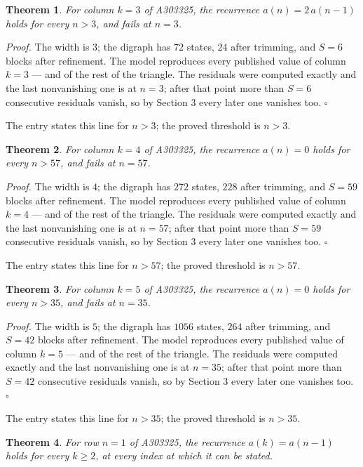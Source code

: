 \documentclass[11pt]{article}
\newtheorem{theorem}{Theorem}
\theoremstyle{definition}
\begin{document}
\begin{theorem} For column $k = 3$ of A303325, the recurrence $a(n) = 2\,a(n-1)$ holds for every $n > 3$, and fails at $n = 3$.\end{theorem}

{\itshape Proof.} The width is $3$; the digraph has $72$ states, $24$ after trimming, and $S = 6$ blocks after refinement. The model reproduces every published value of column $k = 3$ --- and of the rest of the triangle. The residuals were computed exactly and the last nonvanishing one is at $n = 3$; after that point more than $S = 6$ consecutive residuals vanish, so by Section 3 every later one vanishes too. $\square$

The entry states this line for $n > 3$; the proved threshold is $n > 3$.

\begin{theorem} For column $k = 4$ of A303325, the recurrence $a(n) = 0$ holds for every $n > 57$, and fails at $n = 57$.\end{theorem}

{\itshape Proof.} The width is $4$; the digraph has $272$ states, $228$ after trimming, and $S = 59$ blocks after refinement. The model reproduces every published value of column $k = 4$ --- and of the rest of the triangle. The residuals were computed exactly and the last nonvanishing one is at $n = 57$; after that point more than $S = 59$ consecutive residuals vanish, so by Section 3 every later one vanishes too. $\square$

The entry states this line for $n > 57$; the proved threshold is $n > 57$.

\begin{theorem} For column $k = 5$ of A303325, the recurrence $a(n) = 0$ holds for every $n > 35$, and fails at $n = 35$.\end{theorem}

{\itshape Proof.} The width is $5$; the digraph has $1056$ states, $264$ after trimming, and $S = 42$ blocks after refinement. The model reproduces every published value of column $k = 5$ --- and of the rest of the triangle. The residuals were computed exactly and the last nonvanishing one is at $n = 35$; after that point more than $S = 42$ consecutive residuals vanish, so by Section 3 every later one vanishes too. $\square$

The entry states this line for $n > 35$; the proved threshold is $n > 35$.

\begin{theorem} For row $n = 1$ of A303325, the recurrence $a(k) = a(n-1)$ holds for every $k \ge 2$, at every index at which it can be stated.\end{theorem}
\end{document}
